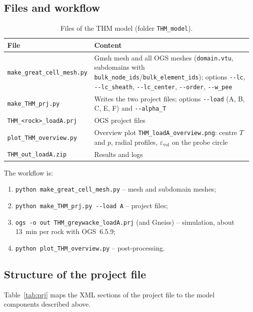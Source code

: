 \documentclass[11pt,a4paper]{article}
\begin{document}
\subsection{Files and workflow}
\begin{table}[htbp]
\centering
\caption{Files of the THM model (folder \texttt{THM\_model}).}
\label{tab:files}
\begin{tabularx}{\textwidth}{@{}lL@{}}
\toprule
File & Content \\
\midrule
\texttt{make\_great\_cell\_mesh.py} & Gmsh mesh and all OGS meshes (\texttt{domain.vtu}, subdomains with \texttt{bulk\_node\_ids}/\texttt{bulk\_element\_ids}); options \texttt{-{}-lc}, \texttt{-{}-lc\_sheath}, \texttt{-{}-lc\_center}, \texttt{-{}-order}, \texttt{-{}-w\_pee} \\
\texttt{make\_THM\_prj.py} & Writes the two project files; options \texttt{-{}-load} (A, B, C, E, F) and \texttt{-{}-alpha\_T} \\
\texttt{THM\_<rock>\_loadA.prj} & OGS project files \\
\texttt{plot\_THM\_overview.py} & Overview plot \texttt{THM\_loadA\_overview.png}: centre $T$ and $p$, radial profiles, $\varepsilon_\mathrm{vol}$ on the probe circle \\
\texttt{THM\_out\_loadA.zip} & Results and logs \\
\bottomrule
\end{tabularx}
\end{table}

The workflow is:
\begin{enumerate}
  \item \texttt{python make\_great\_cell\_mesh.py} -- mesh and subdomain meshes;
  \item \texttt{python make\_THM\_prj.py -{}-load A} -- project files;
  \item \texttt{ogs -o out THM\_greywacke\_loadA.prj} (and Gneiss) -- simulation,
        about 13~min per rock with OGS~6.5.9;
  \item \texttt{python plot\_THM\_overview.py} -- post-processing.
\end{enumerate}

\subsection{Structure of the project file}
Table~\ref{tab:prj} maps the XML sections of the project file to the model
components described above.
\end{document}
